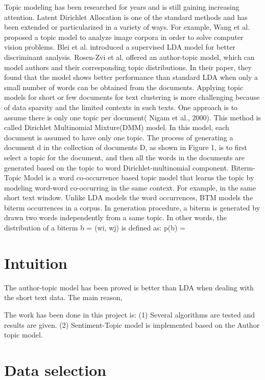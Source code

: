 \documentclass[12pt]{amsart}
\newcommand{\0}{\mat{0}}
\newcommand{\1}{\mathds{1}}
\begin{document}
Topic modeling has been researched for years and is still gaining increasing attention. Latent Dirichlet Allocation is one of the standard methods and has been extended or particularized in a variety of ways. For example, Wang et al. proposed a topic model to analyze image corpora in order to solve computer vision problems. Blei et al. introduced a supervised LDA model for better discriminant analysis. Rosen-Zvi et al. offered an author-topic model, which can model authors and their corresponding topic distributions. In their paper, they found that the model shows better performance than standard LDA when only a small number of words can be obtained from the documents. Applying topic models for short or few documents for text clustering is more challenging because of data sparsity and the limited contexts in such texts. One approach is to assume there is only one topic per document( Nigam et al., 2000). This method is called Dirichlet Multinomial Mixture(DMM) model. In this model, each document is assumed to have only one topic. The process of generating a document d in the collection of documents D, as shown in Figure 1, is to first select a topic for the document, and then all the words in the documents are generated based on the topic to word Dirichlet-multinomial component.
Biterm-Topic Model is a word co-occurrence based topic model that learns the topic by modeling word-word co-occurring in the same context. For example, in the same short text window. Unlike LDA models the word occurrences, BTM models the biterm occurrences in a corpus. In generation procedure, a biterm is generated by drawn two words independently from a same topic. In other words, the distribution of a biterm b = (wi, wj) is defined as:
p(b) =

\section{Intuition}

The author-topic model has been proved is better than LDA when dealing with the short text data. The main reason,

The work has been done in this project is:
(1) Several algorithms are tested and results are given.
(2) Sentiment-Topic model is implemented based on the Author topic model.

\section{Data selection}
\end{document}

